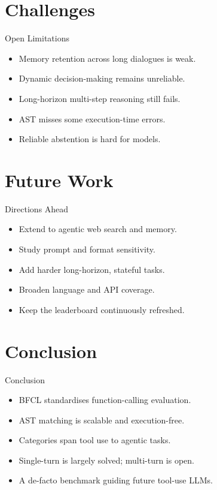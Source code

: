 \documentclass{beamer}
\begin{document}
\section{Challenges}
\begin{frame}{Open Limitations}
\begin{itemize}
\item Memory retention across long dialogues is weak.
\item Dynamic decision-making remains unreliable.
\item Long-horizon multi-step reasoning still fails.
\item AST misses some execution-time errors.
\item Reliable abstention is hard for models.
\end{itemize}
\end{frame}

\section{Future Work}
\begin{frame}{Directions Ahead}
\begin{itemize}
\item Extend to agentic web search and memory.
\item Study prompt and format sensitivity.
\item Add harder long-horizon, stateful tasks.
\item Broaden language and API coverage.
\item Keep the leaderboard continuously refreshed.
\end{itemize}
\end{frame}

\section{Conclusion}
\begin{frame}{Conclusion}
\begin{itemize}
\item BFCL standardises function-calling evaluation.
\item AST matching is scalable and execution-free.
\item Categories span tool use to agentic tasks.
\item Single-turn is largely solved; multi-turn is open.
\item A de-facto benchmark guiding future tool-use LLMs.
\end{itemize}
\end{frame}
\end{document}
